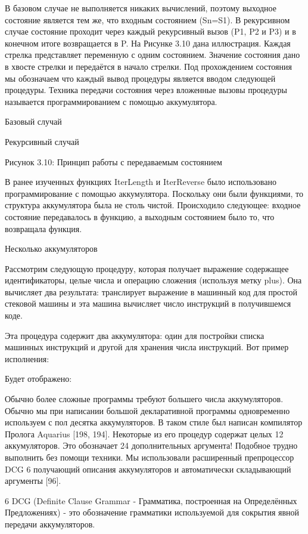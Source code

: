 В базовом случае не выполняется никаких вычислений, поэтому выходное состояние является тем же, что входным состоянием (Sn=S1). В рекурсивном случае состояние проходит через каждый рекурсивный вызов (P1, P2 и P3) и в конечном итоге возвращается в P. На Рисунке 3.10 дана иллюстрация. Каждая стрелка представляет переменную с одним состоянием. Значение состояния дано в хвосте стрелки и передаётся в начало стрелки. Под прохождением состояния мы обозначаем что каждый вывод процедуры является вводом следующей процедуры. Техника передачи состояния через вложенные вызовы процедуры называется программированием с помощью аккумулятора.

Базовый случай

Рекурсивный случай

Рисунок 3.10: Принцип работы с передаваемым состоянием

В ранее изученных функциях IterLength и IterReverse было использовано программирование с помощью аккумулятора. Поскольку они были функциями, то структура аккумулятора была не столь чистой. Происходило следующее: входное состояние передавалось в функцию, а выходным состоянием было то, что возвращала функция.

Несколько аккумуляторов

Рассмотрим следующую процедуру, которая получает выражение содержащее идентификаторы, целые числа и операцию сложения (используя метку plus). Она вычисляет два результата: транслирует выражение в машинный код для простой стековой машины и эта машина вычисляет число инструкций в получившемся коде.

Эта процедура содержит два аккумулятора: один для постройки списка машинных инструкций и другой для хранения числа инструкций. Вот пример исполнения:

Будет отображено:

Обычно более сложные программы требуют большего числа аккумуляторов. Обычно мы при написании большой декларативной программы одновременно используем с пол десятка аккумуляторов. В таком стиле был написан компилятор Пролога Aquarius [198, 194]. Некоторые из его процедур содержат целых 12 аккумуляторов. Это обозначает 24 дополнительных аргумента! Подобное трудно выполнить без помощи техники. Мы использовали расширенный препроцессор DCG 6 получающий описания аккумуляторов и автоматически складывающий аргументы [96].

6 DCG (Definite Clause Grammar - Грамматика, построенная на Определённых Предложениях) - это обозначение грамматики используемой для сокрытия явной передачи аккумуляторов.

